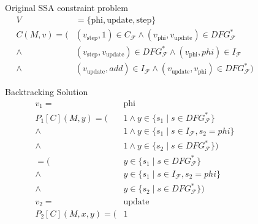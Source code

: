 \begin{figure}[p]
    \begin{blackwhitebox}{Original SSA constraint problem}
        \setlength{\abovedisplayskip}{0pt}
        \setlength{\belowdisplayskip}{0pt}
        \vspace{-0.5em}
        \begin{align*}
            V&{}=\{\text{phi}, \text{update}, \text{step}\}\\
            C(M,v)=         ({}&(v_\text{step},1)
                                 \in C_\mathcal{F}
                \mathrel\land   (v_\text{phi},v_\text{update})
                                 \in DFG_\mathcal{F}^*\\
                \mathrel\land{}&(v_\text{step},v_\text{update})
                                 \in DFG_\mathcal{F}^*
                \mathrel\land   (v_\text{phi}, phi)
                                 \in I_\mathcal{F}\\
                \mathrel\land{}&(v_\text{update}, add)
                                 \in I_\mathcal{F}
                \mathrel\land   (v_\text{update},v_\text{phi})
                                 \in DFG_\mathcal{F}^*)
        \end{align*}
    \end{blackwhitebox}
    \begin{blackwhitebox}{Backtracking Solution}
        \setlength{\abovedisplayskip}{0pt}
        \setlength{\belowdisplayskip}{0pt}
        \vspace{-0.5em}
        \begin{align*}
            v_1={}&\text{phi}\\
            P_1[C](M,y)=      (&1
                \mathrel\land   y\in\{s_1\mid s\in DFG_\mathcal{F}^*\}\\
                \mathrel\land{}&1
                \mathrel\land   y\in\{s_1\mid s\in I_\mathcal{F}, s_2=phi\}\\
                \mathrel\land{}&1
                \mathrel\land   y\in\{s_2\mid s\in DFG_\mathcal{F}^*\})\\[1em]
                       =      (&y\in\{s_1\mid s\in DFG_\mathcal{F}^*\}\\
                \mathrel\land{}&y\in\{s_1\mid s\in I_\mathcal{F}, s_2=phi\}\\
                \mathrel\land{}&y\in\{s_2\mid s\in DFG_\mathcal{F}^*\})\\[1em]
            v_2={}&\text{update}\\
            P_2[C](M,x,y)=    (&1

\end{align*}
\end{blackwhitebox}
\end{figure}
